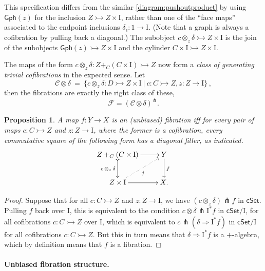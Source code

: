 \documentclass[12pt]{article}
\newcommand{\cSet}{\ensuremath{\mathsf{cSet}}}
\newcommand{\mono}{\ensuremath{\rightarrowtail}}
\newcommand{\ra}{\ensuremath{\rightarrow}}
\newcommand{\I}{\ensuremath{\mathrm{I}}}
\newtheorem{proposition}[theorem]{Proposition}
\theoremstyle{remark}
\theoremstyle{definition}
\begin{document}
This specification differs from the similar \eqref{diagram:pushoutproduct} by using $\mathsf{Gph}(z)$ for the inclusion $Z\mono Z\times\I$, rather than one of the ``face maps'' associated to the endpoint inclusions $\delta_\epsilon : 1\ra\I$. (Note that a graph is always a cofibration by pulling back a diagonal.)  The subobject $c \otimes_z\!\delta \mono Z\times \I$ is the join of the subobjects $\mathsf{Gph}(z) \mono Z\times \I$ and the cylinder $C\times \I \mono Z\times \I$.

The maps of the form $c\otimes_z\delta : Z +_C (C\times\I) \mono Z$  now form a \emph{class of generating trivial cofibrations} in the expected sense.  Let 
\begin{equation}\label{eq:generatingtrivialcofibrations}
\mathcal{C}\otimes\delta\ =\ \{ c \otimes_z \delta : D \mono Z \times \I\ |\ c : C\mono Z, z:Z\ra\I \}\,,
\end{equation}
then the fibrations are exactly the right class of these,
\[
\mathcal{F} = (\mathcal{C}\otimes\delta)^{\pitchfork}.
\]
\begin{proposition}\label{prop:fibiffrlp}
A map $f: Y\ra X$ is an (unbiased) fibration iff for every pair of maps $c : C\mono Z$ and $z:Z\ra\I$, where the former is a cofibration, every commutative square of the following form has a diagonal filler, as indicated.
\begin{equation}\label{diagram:unbiasedfibration}
\xymatrix{
Z +_C (C\times\I) \ar@{>->}[d]_{c\, \otimes_z\, \delta} \ar[r] & Y \ar[d]^f \\
Z\times \I \ar@{.>}[ru]_{j} \ar[r] & X.
}
\end{equation}
\end{proposition}

\begin{proof}
Suppose that for all $c : C\mono Z$ and $z:Z\ra\I$, we have $(c\otimes_z\delta) \pitchfork f$ in $\cSet$. Pulling $f$ back over $\I$, this is equivalent to the condition $c\otimes\delta \pitchfork \I^*f$ in $\cSet/\I$, for all cofibrations $c : C\mono Z$ over $\I$, which is equivalent to $c\pitchfork(\delta\Rightarrow \I^*f)$ in $\cSet/\I$ for all cofibrations $c : C\mono Z$.  But this in turn means that $\delta\Rightarrow\I^*f$ is a $+$-algebra, which by definition means that $f$ is a fibration.
\end{proof}

\paragraph{Unbiased fibration structure.}
\end{document}
